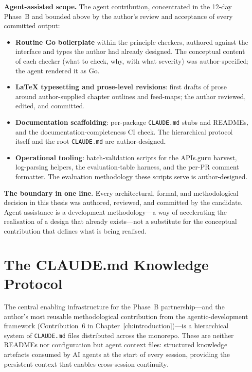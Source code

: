 \textbf{Agent-assisted scope.} The agent contribution, concentrated in the 12-day Phase~B and bounded above by the author's review and acceptance of every committed output:

\begin{itemize}\setlength\itemsep{0.25em}
\item \textbf{Routine Go boilerplate} within the principle checkers, authored against the interface and types the author had already designed. The conceptual content of each checker (what to check, why, with what severity) was author-specified; the agent rendered it as Go.
\item \textbf{LaTeX typesetting and prose-level revisions}: first drafts of prose around author-supplied chapter outlines and feed-maps; the author reviewed, edited, and committed.
\item \textbf{Documentation scaffolding}: per-package \texttt{CLAUDE.md} stubs and READMEs, and the documentation-completeness CI check. The hierarchical protocol itself and the root \texttt{CLAUDE.md} are author-designed.
\item \textbf{Operational tooling}: batch-validation scripts for the APIs.guru harvest, log-parsing helpers, the evaluation-table harness, and the per-PR comment formatter. The evaluation methodology these scripts serve is author-designed.
\end{itemize}

\textbf{The boundary in one line.} Every architectural, formal, and methodological decision in this thesis was authored, reviewed, and committed by the candidate. Agent assistance is a development methodology---a way of accelerating the realisation of a design that already exists---not a substitute for the conceptual contribution that defines what is being realised.

\section{The CLAUDE.md Knowledge Protocol}
\label{sec:claudemd-protocol}

The central enabling infrastructure for the Phase~B partnership---and the author's most reusable methodological contribution from the agentic-development framework (Contribution~6 in Chapter~\ref{ch:introduction})---is a hierarchical system of \texttt{CLAUDE.md} files distributed across the monorepo. These are neither READMEs nor configuration but agent context files: structured knowledge artefacts consumed by AI agents at the start of every session, providing the persistent context that enables cross-session continuity.

